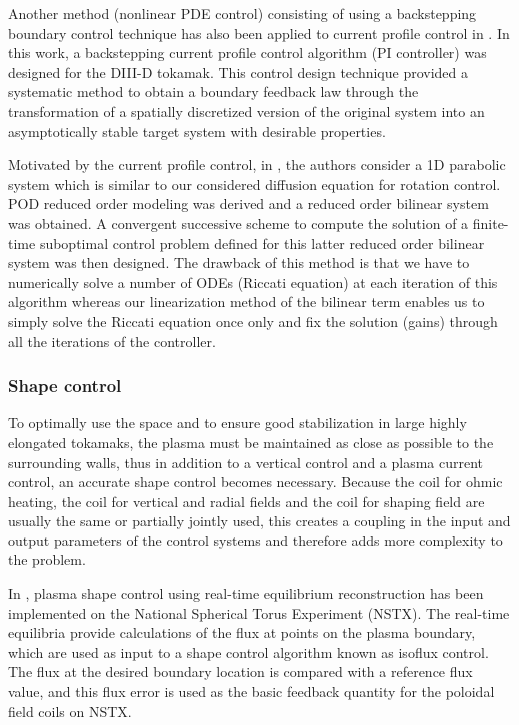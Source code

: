 \documentclass[12pt,lot, lof]{puthesis}
\begin{document}
Another method (nonlinear PDE control) consisting of using a backstepping boundary control technique has also been applied to current profile control in \cite{Boyer14}. In this work, a backstepping current profile control algorithm (PI controller) was designed for the DIII-D tokamak. This control design technique provided a systematic method to obtain a boundary feedback law through the transformation of a spatially discretized version of the original system into an asymptotically stable target system with desirable properties. 

Motivated by the current profile control, in \cite{Xu11}, the authors consider a 1D parabolic system which is similar to our considered diffusion equation for rotation control. POD reduced order modeling was derived and a reduced order bilinear system was obtained. A convergent successive scheme to compute the solution of a finite-time suboptimal control problem defined for this latter reduced order bilinear system was then designed.
The drawback of this method is that we have to numerically solve a number of ODEs (Riccati equation) at each iteration of this algorithm whereas our linearization method of the bilinear term enables us to simply solve the Riccati equation once only and fix the solution (gains) through all the iterations of the controller.


 \subsubsection{{Shape control}} 
To optimally use the space and to ensure good stabilization in large highly elongated tokamaks, the plasma must be maintained as close as possible to the surrounding walls, thus in addition to a vertical control and a plasma current control, an accurate shape control becomes necessary. Because the coil for ohmic heating, the coil for vertical and radial fields and the coil for shaping field are usually the same or partially jointly used, this creates a coupling in the input and output parameters of the control systems and therefore adds more complexity to the problem.

In \cite{Gates05}, plasma shape control using real-time equilibrium reconstruction has been implemented on the National Spherical Torus Experiment (NSTX). The real-time equilibria provide calculations of the flux at points on the plasma boundary, which are used as input to a shape control algorithm known as isoflux control. The flux at the desired boundary location is compared with a reference flux value, and this flux error is used as the basic feedback quantity for the poloidal field coils on NSTX.
\end{document}
